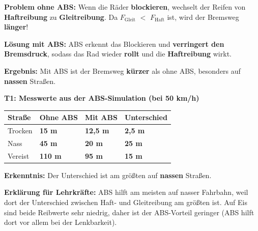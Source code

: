 \documentclass[11pt,a4paper]{article}
\newcommand{\aufgabe}[1]{\noindent\textbf{\textcolor{fachfarbe}{#1}}}
\newcommand{\lsg}[1]{\textcolor{loesung}{\textbf{#1}}}
\newcommand{\stern}[1]{\textcolor{merkerand}{\textbf{#1}}}
\begin{document}
\vspace{0.3em}

\begin{merkebox}[title=B3: ABS -- Das Antiblockiersystem \stern{$\star\star\star$}]
\small
\textbf{Problem ohne ABS:} Wenn die Räder \lsg{blockieren}, wechselt der Reifen von \lsg{Haftreibung} zu \lsg{Gleitreibung}. Da $F_{\text{Gleit}}$ \lsg{$<$} $F_{\text{Haft}}$ ist, wird der Bremsweg \lsg{länger}!

\vspace{0.3em}
\textbf{Lösung mit ABS:} ABS erkennt das Blockieren und \lsg{verringert den Bremsdruck}, sodass das Rad wieder \lsg{rollt} und die \lsg{Haftreibung} wirkt.

\vspace{0.3em}
\textbf{Ergebnis:} Mit ABS ist der Bremsweg \lsg{kürzer} als ohne ABS, besonders auf \lsg{nassen} Straßen.
\end{merkebox}

\vspace{0.3em}

\aufgabe{T1: Messwerte aus der ABS-Simulation (bei 50 km/h)}

\vspace{0.2em}
{\small
\renewcommand{\arraystretch}{1.3}
\begin{tabular}{|p{3cm}|p{3.5cm}|p{3.5cm}|p{3.5cm}|}
\hline
\textbf{Straße} & \textbf{Ohne ABS} & \textbf{Mit ABS} & \textbf{Unterschied} \\
\hline
Trocken & \lsg{15 m} & \lsg{12,5 m} & \lsg{2,5 m} \\
\hline
Nass & \lsg{45 m} & \lsg{20 m} & \lsg{25 m} \\
\hline
Vereist & \lsg{110 m} & \lsg{95 m} & \lsg{15 m} \\
\hline
\end{tabular}
}

\vspace{0.2em}
\textbf{Erkenntnis:} Der Unterschied ist am größten auf \lsg{nassen} Straßen.

\vspace{0.3em}
{\small\textcolor{fachfarbe}{\textbf{Erklärung für Lehrkräfte:}} ABS hilft am meisten auf nasser Fahrbahn, weil dort der Unterschied zwischen Haft- und Gleitreibung am größten ist. Auf Eis sind beide Reibwerte sehr niedrig, daher ist der ABS-Vorteil geringer (ABS hilft dort vor allem bei der Lenkbarkeit).}
\end{document}
